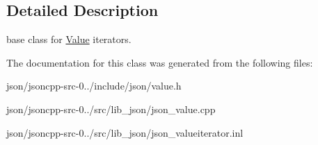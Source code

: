\subsection{Detailed Description}
base class for \hyperlink{class_json_1_1_value}{Value} iterators. 



The documentation for this class was generated from the following files\+:\begin{DoxyCompactItemize}
\item 
json/jsoncpp-\/src-\/0../include/json/value.\+h\item 
json/jsoncpp-\/src-\/0../src/lib\+\_\+json/json\+\_\+value.\+cpp\item 
json/jsoncpp-\/src-\/0../src/lib\+\_\+json/json\+\_\+valueiterator.\+inl\end{DoxyCompactItemize}
